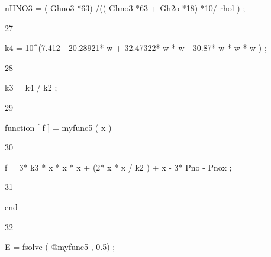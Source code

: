 \documentclass[a4paper,portrait,12pt]{article}
\begin{document}
\begin{flushleft}
nHNO3 = ( Ghno3 *63) /(( Ghno3 *63 + Gh2o *18) *10/ rhol ) ;
\end{flushleft}





27





\begin{flushleft}
k4 = 10\^{}(7.412 - 20.28921* w + 32.47322* w * w - 30.87* w * w * w ) ;
\end{flushleft}





28





\begin{flushleft}
k3 = k4 / k2 ;
\end{flushleft}





29





\begin{flushleft}
function [ f ] = myfunc5 ( x )
\end{flushleft}





30





\begin{flushleft}
f = 3* k3 * x * x * x + (2* x * x / k2 ) + x - 3* Pno - Pnox ;
\end{flushleft}





31





\begin{flushleft}
end
\end{flushleft}





32





\begin{flushleft}
E = fsolve ( @myfunc5 , 0.5) ;
\end{flushleft}
\end{document}
